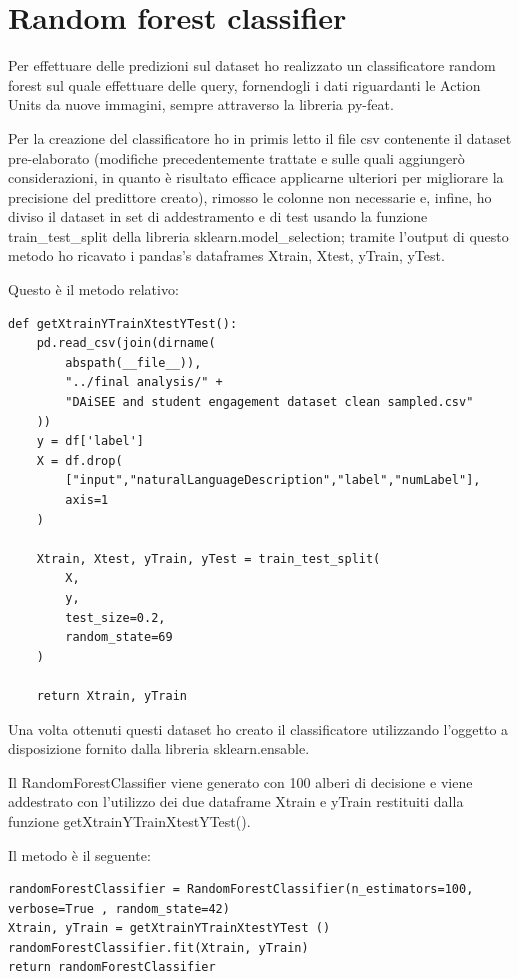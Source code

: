 \section{Random forest classifier}
Per effettuare delle predizioni sul dataset ho realizzato un classificatore random forest sul quale effettuare delle query, fornendogli i dati riguardanti le Action Units da nuove immagini, sempre attraverso la libreria py-feat.

Per la creazione del classificatore ho in primis letto il file csv contenente il dataset pre-elaborato (modifiche precedentemente trattate e sulle quali aggiungerò considerazioni, in quanto è risultato efficace applicarne ulteriori per migliorare la precisione del predittore creato), rimosso le colonne non necessarie e, infine, ho diviso il dataset in set di addestramento e di test usando la funzione train\_test\_split della libreria sklearn.model\_selection; tramite l’output di questo metodo ho ricavato i pandas’s dataframes Xtrain, Xtest, yTrain, yTest.

Questo è il metodo relativo:
\begin{verbatim}
def getXtrainYTrainXtestYTest():
	pd.read_csv(join(dirname(
        abspath(__file__)), 
        "../final analysis/" + 
        "DAiSEE and student engagement dataset clean sampled.csv"
    ))
    y = df['label']
    X = df.drop(
        ["input","naturalLanguageDescription","label","numLabel"], 
        axis=1
    )
    
    Xtrain, Xtest, yTrain, yTest = train_test_split(
        X, 
        y, 
        test_size=0.2, 
        random_state=69
    )

    return Xtrain, yTrain 
\end{verbatim}
Una volta ottenuti questi dataset ho creato il classificatore utilizzando l’oggetto a disposizione fornito dalla libreria sklearn.ensable.

Il RandomForestClassifier viene generato con 100 alberi di decisione e viene addestrato con l’utilizzo dei due dataframe Xtrain e yTrain restituiti dalla funzione getXtrainYTrainXtestYTest().

Il metodo è il seguente:
\begin{verbatim}
randomForestClassifier = RandomForestClassifier(n_estimators=100, verbose=True , random_state=42)
Xtrain, yTrain = getXtrainYTrainXtestYTest ()
randomForestClassifier.fit(Xtrain, yTrain)
return randomForestClassifier
\end{verbatim}


